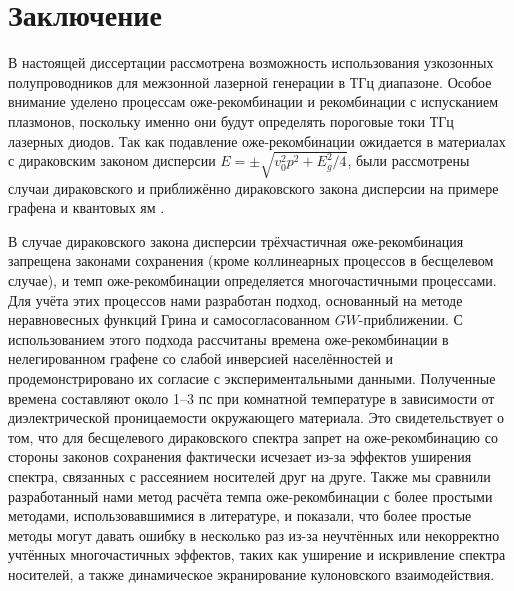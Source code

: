 \chapter*{Заключение}						%
В настоящей диссертации рассмотрена возможность использования узкозонных полупроводников для межзонной лазерной генерации в ТГц диапазоне. Особое внимание уделено процессам оже-рекомбинации и рекомбинации с испусканием плазмонов, поскольку именно они будут определять пороговые токи ТГц лазерных диодов. Так как подавление оже-рекомбинации ожидается в материалах с дираковским законом дисперсии $E = \pm\sqrt{v_0^2 p^2 + E_g^2/4}$, были рассмотрены случаи дираковского и приближённо дираковского закона дисперсии на примере графена и квантовых ям \HgCdTe{}.

В случае дираковского закона дисперсии трёхчастичная оже-рекомбинация запрещена законами сохранения (кроме коллинеарных процессов в бесщелевом случае), и темп оже-рекомбинации определяется многочастичными процессами. Для учёта этих процессов нами разработан подход, основанный на методе неравновесных функций Грина и самосогласованном $GW$-приближении. С использованием этого подхода рассчитаны времена оже-рекомбинации в нелегированном графене со слабой инверсией населённостей и продемонстрировано их согласие с экспериментальными данными. Полученные времена составляют около 1--3 пс при комнатной температуре в зависимости от диэлектрической проницаемости окружающего материала. Это свидетельствует о том, что для бесщелевого дираковского спектра запрет на оже-рекомбинацию со стороны законов сохранения фактически исчезает из-за эффектов уширения спектра, связанных с рассеянием носителей друг на друге. Также мы сравнили разработанный нами метод расчёта темпа оже-рекомбинации с более простыми методами, использовавшимися в литературе, и показали, что более простые методы могут давать ошибку в несколько раз из-за неучтённых или некорректно учтённых многочастичных эффектов, таких как уширение и искривление спектра носителей, а также динамическое экранирование кулоновского взаимодействия. 


